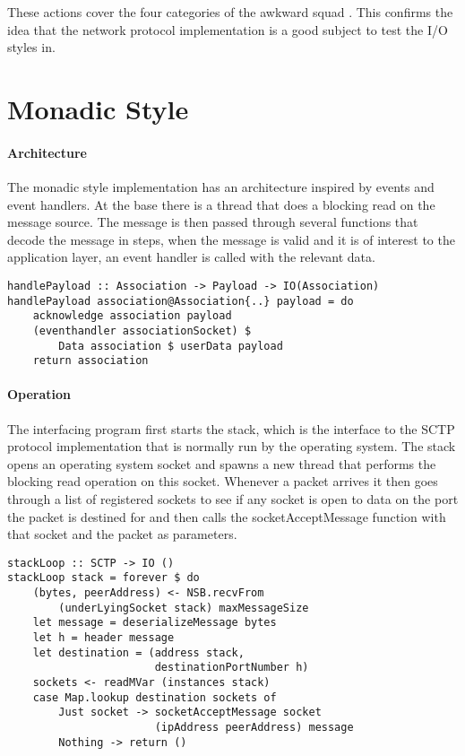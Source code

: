 These actions cover the four categories of the awkward squad \cite{jones_tackling_2009}. 
This confirms the idea that the network protocol implementation is a good subject to test the I/O styles in.
\section{Monadic Style}
\paragraph{Architecture}
The monadic style implementation has an architecture inspired by events and event handlers. At the base there is a thread that does a blocking read on the message source. The message is then passed through several functions that decode the message in steps, when the message is valid and it is of interest to the application layer, an event handler is called with the relevant data.

\begin{lstlisting}[caption={The eventhandler is called when a payload is received}]
handlePayload :: Association -> Payload -> IO(Association)
handlePayload association@Association{..} payload = do 
    acknowledge association payload
    (eventhandler associationSocket) $
	    Data association $ userData payload
    return association
\end{lstlisting}

\paragraph{Operation}
The interfacing program first starts the stack, which is the interface to the SCTP protocol implementation that is normally run by the operating system. The stack opens an operating system socket and spawns a new thread that performs the blocking read operation on this socket. Whenever a packet arrives it then goes through a list of registered sockets to see if any socket is open to data on the port the packet is destined for and then calls the socketAcceptMessage function with that socket and the packet as parameters.

\begin{lstlisting}[caption={The stack loop}]
stackLoop :: SCTP -> IO ()
stackLoop stack = forever $ do
    (bytes, peerAddress) <- NSB.recvFrom 
        (underLyingSocket stack) maxMessageSize
    let message = deserializeMessage bytes
    let h = header message
    let destination = (address stack,
                       destinationPortNumber h)
    sockets <- readMVar (instances stack)
    case Map.lookup destination sockets of
        Just socket -> socketAcceptMessage socket
                       (ipAddress peerAddress) message
        Nothing -> return ()
\end{lstlisting}

